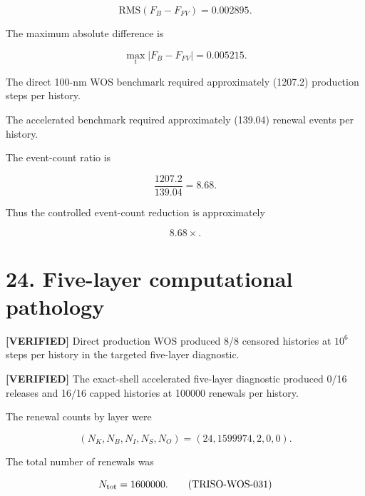 \documentclass[11pt,a4paper]{article}
\begin{document}
\begin{equation}
\boxed{
\mathrm{RMS}(F_B-F_{FV})
=
0.002895.
}
\tag{TRISO-VER-200}
\label{eq:triso-ver-200}
\end{equation}

The maximum absolute difference is

\begin{equation}
\boxed{
\max_t|F_B-F_{FV}|
=
0.005215.
}
\tag{TRISO-VER-201}
\label{eq:triso-ver-201}
\end{equation}

The direct 100-nm WOS benchmark required approximately (1207.2) production steps per history.

The accelerated benchmark required approximately (139.04) renewal events per history.

The event-count ratio is

\begin{equation}
\frac{1207.2}{139.04}
=
8.68.
\tag{TRISO-VER-202}
\label{eq:triso-ver-202}
\end{equation}

Thus the controlled event-count reduction is approximately

\begin{equation}
\boxed{8.68\times.}
\tag{TRISO-VER-203}
\label{eq:triso-ver-203}
\end{equation}

\section*{24. Five-layer computational pathology}

\textbf{[VERIFIED]} Direct production WOS produced 8/8 censored histories at $10^6$ steps per history in the targeted five-layer diagnostic.

\textbf{[VERIFIED]} The exact-shell accelerated five-layer diagnostic produced 0/16 releases and 16/16 capped histories at 100000 renewals per history.

The renewal counts by layer were

\begin{equation}
(N_K,N_B,N_I,N_S,N_O)
=
(24,1599974,2,0,0).
\tag{TRISO-WOS-030}
\label{eq:triso-wos-030}
\end{equation}

The total number of renewals was

\begin{equation}
N_{\rm tot}=1600000.
\tag{TRISO-WOS-031}
\label{eq:triso-wos-031}
\end{equation}
\end{document}
